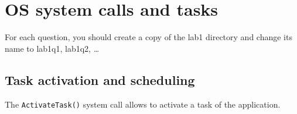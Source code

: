 \documentclass[11pt]{report}
\begin{document}





\section{OS system calls and tasks}

For each question, you should create a copy of the lab1 directory and change its name to lab1q1, lab1q2, \ldots

\subsection{Task activation and scheduling}

The \texttt{ActivateTask()} system call allows to activate a task of the application.
\end{document}
